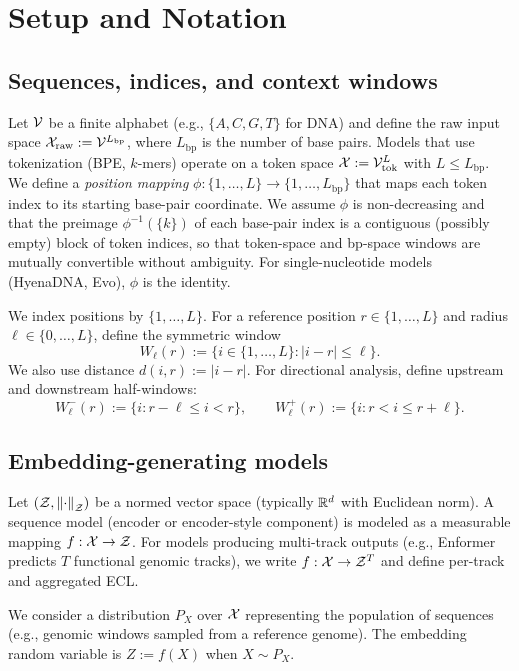 \section{Setup and Notation}\label{sec:setup}

\subsection{Sequences, indices, and context windows}
Let $\mathcal{V}$ be a finite alphabet (e.g., $\{A,C,G,T\}$ for DNA) and define the raw input space $\mathcal{X}_{\mathrm{raw}} := \mathcal{V}^{L_{\mathrm{bp}}}$, where $L_{\mathrm{bp}}$ is the number of base pairs. Models that use tokenization (BPE, $k$-mers) operate on a token space $\mathcal{X} := \mathcal{V}_{\mathrm{tok}}^{L}$ with $L \leq L_{\mathrm{bp}}$. We define a \emph{position mapping} $\phi:\{1,\dots,L\}\to\{1,\dots,L_{\mathrm{bp}}\}$ that maps each token index to its starting base-pair coordinate. We assume $\phi$ is non-decreasing and that the preimage $\phi^{-1}(\{k\})$ of each base-pair index is a contiguous (possibly empty) block of token indices, so that token-space and bp-space windows are mutually convertible without ambiguity. For single-nucleotide models (HyenaDNA, Evo), $\phi$ is the identity.

We index positions by $\{1,\dots,L\}$. For a reference position $r\in\{1,\dots,L\}$ and radius $\ell\in\{0,\dots,L\}$, define the symmetric window
\[
W_\ell(r) := \{ i\in\{1,\dots,L\} : |i-r|\le \ell\}.
\]
We also use distance $d(i,r):=|i-r|$. For directional analysis, define upstream and downstream half-windows:
\[
W_\ell^-(r) := \{i : r-\ell \le i < r\}, \qquad W_\ell^+(r) := \{i : r < i \le r+\ell\}.
\]

\subsection{Embedding-generating models}

Let $(\mathcal{Z},\left\lVert \cdot \right\rVert_{\mathcal{Z}})$ be a normed vector space (typically $\mathbb{R}^d$ with Euclidean norm). A sequence model (encoder or encoder-style component) is modeled as a measurable mapping $f:\mathcal{X} \to \mathcal{Z}$. For models producing multi-track outputs (e.g., Enformer predicts $T$ functional genomic tracks), we write $f:\mathcal{X} \to \mathcal{Z}^T$ and define per-track and aggregated ECL.

We consider a distribution $P_X$ over $\mathcal{X}$ representing the population of sequences (e.g., genomic windows sampled from a reference genome). The embedding random variable is $Z := f(X)$ when $X\sim P_X$.

